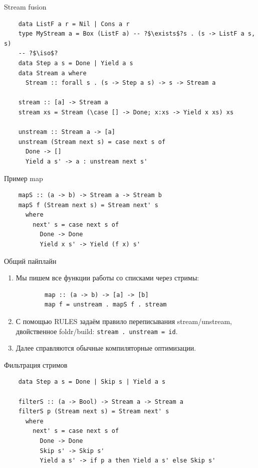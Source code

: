     \begin{frame}[fragile]{Stream fusion}
        \pause
        \begin{verbatim}
    data ListF a r = Nil | Cons a r
    type MyStream a = Box (ListF a) -- ?$\exists$?s . (s -> ListF a s, s)
    -- ?$\iso$?
    data Step a s = Done | Yield a s
    data Stream a where
      Stream :: forall s . (s -> Step a s) -> s -> Stream a

    stream :: [a] -> Stream a
    stream xs = Stream (\case [] -> Done; x:xs -> Yield x xs) xs

    unstream :: Stream a -> [a]
    unstream (Stream next s) = case next s of
      Done -> []
      Yield a s' -> a : unstream next s'
        \end{verbatim}
    \end{frame}

    \begin{frame}[fragile]{Пример map}
        \begin{verbatim}
    mapS :: (a -> b) -> Stream a -> Stream b
    mapS f (Stream next s) = Stream next' s
      where
        next' s = case next s of
          Done -> Done
          Yield x s' -> Yield (f x) s'
        \end{verbatim}
    \end{frame}

    \begin{frame}[fragile]{Общий пайплайн}
        \pause
        \begin{enumerate}
            \item Мы пишем все функции работы со списками через стримы:
            \begin{verbatim}
        map :: (a -> b) -> [a] -> [b]
        map f = unstream . mapS f . stream
            \end{verbatim}
            \item С помощью RULES задаём правило переписывания stream/unstream, двойственное foldr/build: \texttt{stream . unstream = id}.
            \item Далее справляются обычные компиляторные оптимизации.
        \end{enumerate}
    \end{frame}

    \begin{frame}[fragile]{Фильтрация стримов}
        \begin{verbatim}
    data Step a s = Done | Skip s | Yield a s

    filterS :: (a -> Bool) -> Stream a -> Stream a
    filterS p (Stream next s) = Stream next' s
      where
        next' s = case next s of
          Done -> Done
          Skip s' -> Skip s'
          Yield a s' -> if p a then Yield a s' else Skip s'
        \end{verbatim}
    \end{frame}

